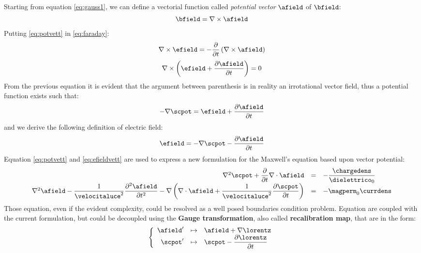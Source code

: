 Starting from equation \ref{eq:gauss1}, we can define a vectorial function called \emph{potential vector} $\afield$ of $\bfield$:
\begin{equation}
\bfield = \nabla\times\afield
\label{eq:potvett}
\end{equation}
 Putting \ref{eq:potvett} in \ref{eq:faraday}:
\[
\nabla\times\efield = - \partialt \left( \nabla\times\afield \right)
\]
\begin{equation}
\nabla\times\left( \efield + \partialtarg{\afield} \right) = 0
\end{equation}
From the previous equation it is evident that the argument between parenthesis is in reality an irrotational vector field, thus a potential function exists such that:
\[
-\nabla\scpot = \efield + \partialtarg{\afield}
\]
and we derive the following definition of electric field:
\begin{equation}
\efield = - \nabla \scpot - \partialtarg{\afield}
\label{eq:efieldvett}
\end{equation}
Equation \ref{eq:potvett} and \ref{eq:efieldvett} are used to express a new formulation for the Maxwell's equation based upon vector potential:
\begin{equation}
\begin{array}{rcl}
\nabla^2\scpot + \partialt \nabla \cdot \afield & = & - \dfrac{\chargedens}{\dielettrico_0} \\
\nabla^2 \afield - \dfrac{1}{\velocitaluce^2} \partialttarg{\afield} - \nabla\left( \nabla \cdot \afield + \dfrac{1}{\velocitaluce^2} \partialtarg{\scpot} \right) & = & -\magperm_0 \currdens
\end{array}
\label{eq:potvecmaxwell}
\end{equation}
Those equation, even if the evident complexity, could be resolved as a well posed boundaries condition problem. Equation are coupled with the current formulation, but could be decoupled using the \textbf{Gauge transformation}, also called \textbf{recalibration map}, that are in the form:
\begin{equation}
\left\{ \begin{array}{rcl}
\afield' & \mapsto & \afield + \nabla \lorentz \\
\scpot' & \mapsto & \scpot - \partialtarg{\lorentz}
\end{array}
\right.
\end{equation}
